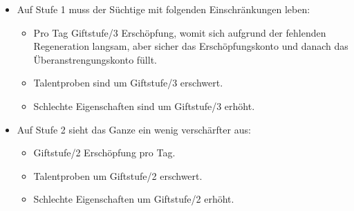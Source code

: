 \begin{itemize}
\begin{itemize}
			\item Auf Stufe 1 muss der Süchtige mit folgenden Einschränkungen leben: 
				\begin{itemize}
					\item Pro Tag Giftstufe/3 Erschöpfung, womit sich aufgrund der fehlenden Regeneration langsam, aber sicher das Erschöpfungskonto und danach das Überanstrengungskonto füllt. 
					\item Talentproben sind um Giftstufe/3 erschwert.
					\item Schlechte Eigenschaften sind um Giftstufe/3 erhöht.
				\end{itemize}
			\item Auf Stufe 2 sieht das Ganze ein wenig verschärfter aus: 
				\begin{itemize}
					\item Giftstufe/2 Erschöpfung pro Tag.
					\item Talentproben um Giftstufe/2 erschwert.
					\item Schlechte Eigenschaften um Giftstufe/2 erhöht.
				\end{itemize}
		\end{itemize}
\end{itemize}
